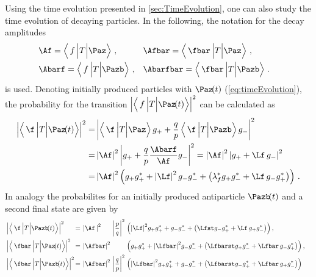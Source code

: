 Using the time evolution presented in \cref{sec:TimeEvolution}, one can also study the time evolution of decaying particles.
In the following, the notation for the decay amplitudes
\begin{equation}
\begin{aligned}
&\Af = \left<\,f\,\Big|T\Big|\Paz\right>\,,&&\Afbar = \left<\,\fbar\,\Big|T\Big|\Paz\right>\,,&\\
&\Abarf = \left<\,f\,\Big|T\Big|\Pazb\right>\,,&&\Abarfbar = \left<\,\fbar\,\Big|T\Big|\Pazb\right>\,.&
\end{aligned}
\end{equation}
is used.
Denoting initially produced particles with $\Paz\!(t)$ (\cref{eq:timeEvolution}), the probability for the transition $\left|\left<\,f\,\Big|T\Big|\Paz\!(t)\right>\right|^2$ can be calculated as
\begin{align}
\left|\left<\,\f\,\Big|T\Big|\Paz\!(t)\right>\right|^2 =&
\left|\left<\,\f\,\Big|T\Big|\Paz\right>g_++\frac{q}{p}\left<\,\f\,\Big|T\Big|\Pazb\right>g_-\right|^2\nonumber\\
=&\left|\Af\right|^2\left|g_+ + \frac{q}{p}\frac{\Abarf}{\Af} g_-\right|^2=\left|\Af\right|^2\left|g_+ +\Lf\,g_-\right|^2\nonumber\\
=&\left|\Af\right|^2\left(g_+g_+^*+\left|\Lf\right|^2g_-g_-^*+\left(\lambda_{f}^*g_+g_-^* + \Lf\, g_-g_+^*\right)\right)\,. \label{eq:ProbTransPtof}
\end{align}
In analogy the probabilites for an initially produced antiparticle $\Pazb\!(t)$ and a second final state \fbar are given by
\begin{align}
&\left|\left<\,\f\,\Big|T\Big|\Pazb\!(t)\right>\right|^2&\kern -8.5pt{=}
&\kern 4.0pt{\left|\Af\,\right|^2}&&\kern -6.5pt{\left|\frac{p}{q}\right|^2}& &\kern -7.0pt{\left(\left|\Lf\right|^2\!g_+g_+^*+g_-g_-^*+\left(\Lfst g_-g_+^* + \Lf\, g_+g_-^*\right)\right)}\,,&\\
&\left|\left<\,\fbar\,\Big|T\Big|\Paz\!(t)\right>\right|^2&\kern -8.5pt{=}
&\kern 4.0pt{\left|\Afbar\right|^2}& && &\kern -7.0pt{\left(g_+g_+^*+\left|\Lfbar\right|^2\!g_-g_-^*+\left(\Lfbarst g_+g_-^* + \Lfbar\, g_-g_+^*\right)\right)}\,,&\\
&\left|\left<\,\fbar\,\Big|T\Big|\Pazb\!(t)\right>\right|^2&\kern -8.5pt{=}
&\kern 4.0pt{\left|\Afbar\right|^2}& &\kern -6.5pt{\left|\frac{q}{p}\right|^2}& &\kern -7.0pt{\left(\left|\Lfbar\right|^2\!g_+g_+^*+g_-g_-^*+\left(\Lfbarst g_-g_+^* + \Lfbar\, g_+g_-^*\right)\right)}&\label{eq:ProbTransPbartofbar}
\end{align}
